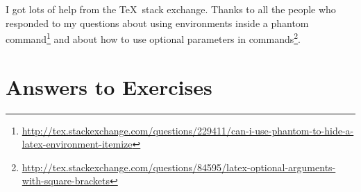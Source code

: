 \documentclass[letter,12pt]{article}
\begin{document}
I got lots of help from the \TeX\ stack exchange.  Thanks to all the people who responded to my questions about using environments inside  a phantom command\footnote{\url{http://tex.stackexchange.com/questions/229411/can-i-use-phantom-to-hide-a-latex-environment-itemize}} and about how to use optional parameters in commands\footnote{\url{http://tex.stackexchange.com/questions/84595/latex-optional-arguments-with-square-brackets}}.


\appendix

\section{Answers to Exercises}

\shipoutAnswer
\end{document}
